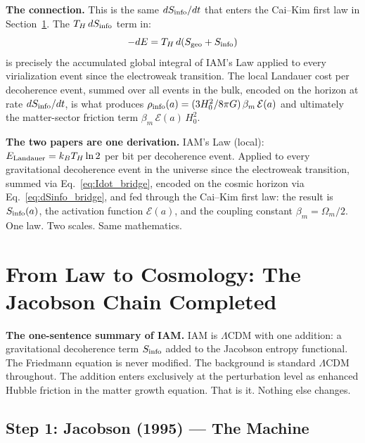\documentclass[12pt,a4paper]{article}
\begin{document}
\textbf{The connection.}
This is the same $dS_{\rm info}/dt$ that enters the Cai--Kim first law
in Section~\ref{sec:jacobson}. The $T_H\,dS_{\rm info}$ term in:
\begin{equation}
-dE = T_H\,d(S_{\rm geo} + S_{\rm info})
\end{equation}
is precisely the accumulated global integral of IAM's Law applied to every
virialization event since the electroweak transition. The local Landauer
cost per decoherence event, summed over all events in the bulk, encoded
on the horizon at rate $dS_{\rm info}/dt$, is what produces
$\rho_{\rm info}(a) = (3H_0^2/8\pi G)\,\beta_m\,\mathcal{E}(a)$
and ultimately the matter-sector friction term $\beta_m\,\mathcal{E}(a)\,H_0^2$.

\begin{keybox}
\textbf{The two papers are one derivation.}
IAM's Law (local): $E_{\rm Landauer} = k_B T_H \ln 2$ per bit per
decoherence event. Applied to every gravitational decoherence event in the
universe since the electroweak transition, summed via
Eq.~\eqref{eq:Idot_bridge}, encoded on the cosmic horizon via
Eq.~\eqref{eq:dSinfo_bridge}, and fed through the Cai--Kim first law:
the result is $S_{\rm info}(a)$, the activation function $\mathcal{E}(a)$,
and the coupling constant $\beta_m = \Omega_m/2$. One law. Two scales.
Same mathematics.
\end{keybox}

\newpage

\section{From Law to Cosmology: The Jacobson Chain Completed}
\label{sec:jacobson}

\begin{keybox}
\textbf{The one-sentence summary of IAM.}
IAM is $\Lambda$CDM with one addition: a gravitational decoherence term
$S_{\rm info}$ added to the Jacobson entropy functional.
The Friedmann equation is never modified. The background is standard $\Lambda$CDM
throughout. The addition enters exclusively at the perturbation level as
enhanced Hubble friction in the matter growth equation.
That is it. Nothing else changes.
\end{keybox}

\subsection{Step 1: Jacobson (1995) --- The Machine}
\end{document}
